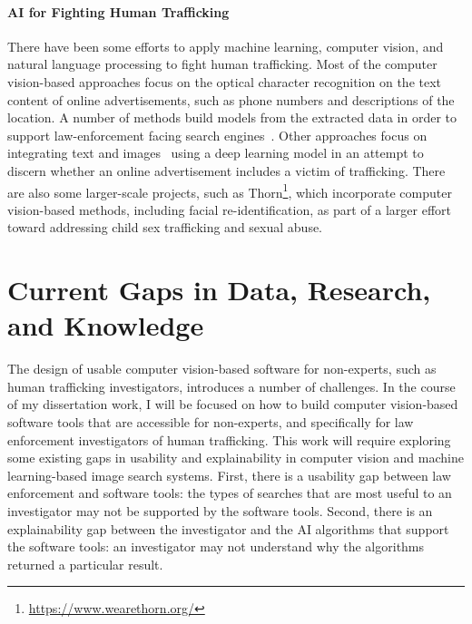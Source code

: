\documentclass[12pt]{article}
\begin{document}
\paragraph{AI for Fighting Human Trafficking}
There have been some efforts to apply machine learning, computer vision, and natural language processing to fight human trafficking. Most of the computer vision-based approaches focus on the optical character recognition on the text content of online advertisements, such as phone numbers and descriptions of the location. A number of methods build models from the extracted data in order to support law-enforcement facing search engines~\cite{alvari2017semi,dubrawski2015leveraging,kejriwal2017investigative,szekely2015building}. Other approaches focus on integrating text and images~\cite{tong2017combating} using a deep learning model in an attempt to discern whether an online advertisement includes a victim of trafficking. There are also some larger-scale projects, such as Thorn\footnote{\url{https://www.wearethorn.org/}}, which incorporate computer vision-based methods, including facial re-identification, as part of a larger effort toward addressing child sex trafficking and sexual abuse.

\section{Current Gaps in Data, Research, and Knowledge}
\label{sec:gaps}

The design of usable computer vision-based software for non-experts, such as human trafficking investigators, introduces a number of challenges. In the course of my dissertation work, I will be focused on how to build computer vision-based software tools that are accessible for non-experts, and specifically for law enforcement investigators of human trafficking. This work will require exploring some existing gaps in usability and explainability in computer vision and machine learning-based image search systems. First, there is a usability gap between law enforcement and software tools: the types of searches that are most useful to an investigator may not be supported by the software tools. Second, there is an explainability gap between the investigator and the AI algorithms that support the software tools: an investigator may not understand why the algorithms returned a particular result.
\end{document}
